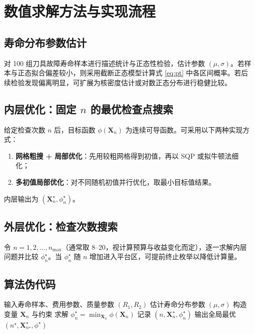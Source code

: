 \chapter{数值求解方法与实现流程}

\section{寿命分布参数估计}
对 100 组刀具故障寿命样本进行描述统计与正态性检验，估计参数 $(\mu,\sigma)$。若样本与正态拟合偏差较小，则采用截断正态模型计算式 \eqref{eq:pt} 中各区间概率。若后续检验发现偏离明显，可扩展为核密度估计或对数正态分布进行稳健比较。

\section{内层优化：固定 $n$ 的最优检查点搜索}
给定检查次数 $n$ 后，目标函数 $\phi(\mathbf X_n)$ 为连续可导函数。可采用以下两种实现方式：
\begin{enumerate}
  \item \textbf{网格粗搜 + 局部优化}：先用较粗网格得到初值，再以 SQP 或拟牛顿法细化；
  \item \textbf{多初值局部优化}：对不同随机初值并行优化，取最小目标值结果。
\end{enumerate}
内层输出为 $(\mathbf X_n^\star,\phi_n^\star)$。

\section{外层优化：检查次数搜索}
令 $n=1,2,\ldots,n_{\max}$（通常取 8--20，视计算预算与收益变化而定），逐一求解内层问题并比较 $\phi_n^\star$。当 $\phi_n^\star$ 随 $n$ 增加进入平台区，可提前终止枚举以降低计算量。

\section{算法伪代码}
\begin{algorithm}[H]
\caption{刀具检查策略双层优化}
\begin{algorithmic}[1]
\State 输入寿命样本、费用参数、质量参数 $(R_1,R_2)$
\State 估计寿命分布参数 $(\mu,\sigma)$
  \State 构造变量 $\mathbf X_n$ 与约束
  \State 求解 $\phi_n^\star=\min_{\mathbf X_n}\phi(\mathbf X_n)$
  \State 记录 $(n,\mathbf X_n^\star,\phi_n^\star)$
\EndFor
\State 输出全局最优 $(n^\star,\mathbf X_{n^\star}^\star,\phi^\star)$
\end{algorithmic}
\end{algorithm}

